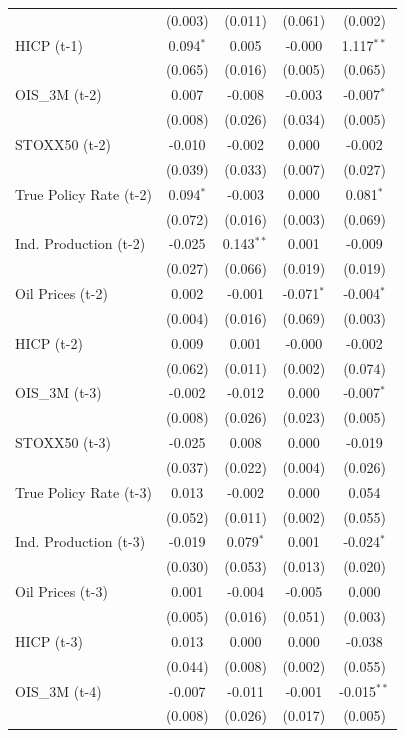 \begin{longtable}[t]{lcccc}
 & (0.003) & (0.011) & (0.061) & (0.002)\\
HICP (t-1) & 0.094$^{*}$ & 0.005 & -0.000 & 1.117$^{**}$\\
 & (0.065) & (0.016) & (0.005) & (0.065)\\
OIS\_3M (t-2) & 0.007 & -0.008 & -0.003 & -0.007$^{*}$\\
 & (0.008) & (0.026) & (0.034) & (0.005)\\
STOXX50 (t-2) & -0.010 & -0.002 & 0.000 & -0.002\\
 & (0.039) & (0.033) & (0.007) & (0.027)\\
True Policy Rate (t-2) & 0.094$^{*}$ & -0.003 & 0.000 & 0.081$^{*}$\\
 & (0.072) & (0.016) & (0.003) & (0.069)\\
Ind. Production (t-2) & -0.025 & 0.143$^{**}$ & 0.001 & -0.009\\
 & (0.027) & (0.066) & (0.019) & (0.019)\\
Oil Prices (t-2) & 0.002 & -0.001 & -0.071$^{*}$ & -0.004$^{*}$\\
 & (0.004) & (0.016) & (0.069) & (0.003)\\
HICP (t-2) & 0.009 & 0.001 & -0.000 & -0.002\\
 & (0.062) & (0.011) & (0.002) & (0.074)\\
OIS\_3M (t-3) & -0.002 & -0.012 & 0.000 & -0.007$^{*}$\\
 & (0.008) & (0.026) & (0.023) & (0.005)\\
STOXX50 (t-3) & -0.025 & 0.008 & 0.000 & -0.019\\
 & (0.037) & (0.022) & (0.004) & (0.026)\\
True Policy Rate (t-3) & 0.013 & -0.002 & 0.000 & 0.054\\
 & (0.052) & (0.011) & (0.002) & (0.055)\\
Ind. Production (t-3) & -0.019 & 0.079$^{*}$ & 0.001 & -0.024$^{*}$\\
 & (0.030) & (0.053) & (0.013) & (0.020)\\
Oil Prices (t-3) & 0.001 & -0.004 & -0.005 & 0.000\\
 & (0.005) & (0.016) & (0.051) & (0.003)\\
HICP (t-3) & 0.013 & 0.000 & 0.000 & -0.038\\
 & (0.044) & (0.008) & (0.002) & (0.055)\\
OIS\_3M (t-4) & -0.007 & -0.011 & -0.001 & -0.015$^{**}$\\
 & (0.008) & (0.026) & (0.017) & (0.005)\\

\end{longtable}
